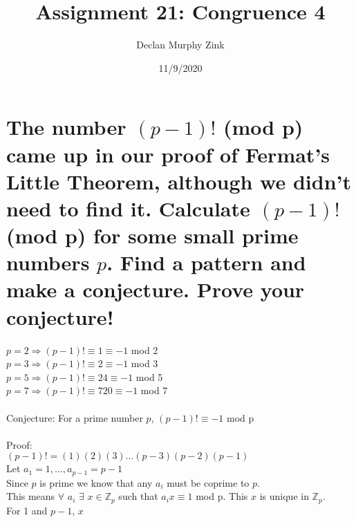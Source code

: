 \documentclass[12pt]{article}
\begin{document}
\title{Assignment 21: Congruence 4}
\author{Declan Murphy Zink}
\date{11/9/2020}
\maketitle

\setcounter{section}{5}

\section{
    The number $(p-1)!$ (mod p) came up in our proof of Fermat's Little Theorem, although we didn't need to find it.
    Calculate $(p-1)!$ (mod p) for some small prime numbers $p$. Find a pattern and make a conjecture.
    Prove your conjecture!
}
$p=2 \Rightarrow (p-1)! \equiv 1 \equiv -1$ mod 2\\
$p=3 \Rightarrow (p-1)! \equiv 2 \equiv -1$ mod 3\\
$p=5 \Rightarrow (p-1)! \equiv 24 \equiv -1$ mod 5\\
$p=7 \Rightarrow (p-1)! \equiv 720 \equiv -1$ mod 7\\\\
Conjecture: For a prime number $p$, $(p-1)! \equiv -1$ mod p\\\\
Proof:\\
$(p-1)! = (1)(2)(3)...(p-3)(p-2)(p-1)$\\
Let $a_1 = 1,..., a_{p-1} = p-1$\\
Since $p$ is prime we know that any $a_i$ must be coprime to $p$.\\
This means $\forall$ $a_i$ $\exists$ $x \in \mathds{Z}_p$ such that $a_i x \equiv 1$ mod p.
This $x$ is unique in $\mathds{Z}_p$.\\
For 1 and $p-1$, $x$ 
\end{document}
